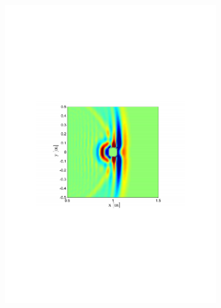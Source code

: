 \begin{figure}
\begin{subfigure}[b]{0.48\textwidth}
                \includegraphics[width=\textwidth]{images/02_Konzeptionierung/sim_wave_3000_3}
        \end{subfigure}
        ~ %
        \begin{subfigure}[b]{0.48\textwidth}
                \centering

\end{subfigure}
\end{figure}
